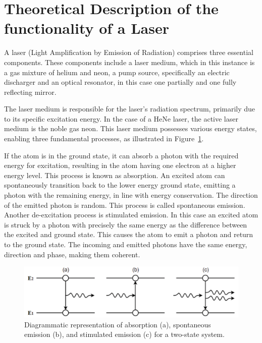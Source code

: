 \section{Theoretical Description of the functionality of a Laser}
\label{sec:theory}

\noindent
A laser (Light Amplification by Emission of Radiation) comprises
three essential components. These components include a laser medium, 
which in this instance is a gas mixture of helium and neon, a pump
source, specifically an electric discharger and an optical resonator, 
in this case one partially and one fully reflecting mirror.

\noindent
The laser medium is responsible for the laser's radiation spectrum, 
primarily due to its specific excitation energy. In the case 
of a HeNe laser, the active laser medium is the noble gas neon. 
This laser medium possesses various energy states, enabling three 
fundamental processes, as illustrated in Figure~\ref{fig:emission}.

\noindent
If the atom is in the ground state, it can absorb a photon with
the required energy for excitation, resulting in the atom having
one electron at a higher energy level. This process is known as 
absorption. An excited atom can spontaneously transition back 
to the lower energy ground state, emitting a photon with the remaining
energy, in line with energy conservation. The direction of the emitted
photon is random. This process is called spontaneous emission.
Another de-excitation process is stimulated emission. In this case
an excited atom is struck by a photon with precisely the same 
energy as the difference between the excited and ground state. 
This causes the atom to emit a photon and return to the ground state.
The incoming and emitted photons have the same energy, direction and 
phase, making them coherent.

\begin{figure}
    \centering
    \includegraphics[width=0.8\linewidth]{pictures/emission.png} %
    \caption{Diagrammatic representation of absorption (a), spontaneous emission (b), and stimulated emission (c) for a two-state system. \cite{emission}}
    \label{fig:emission}
\end{figure}


